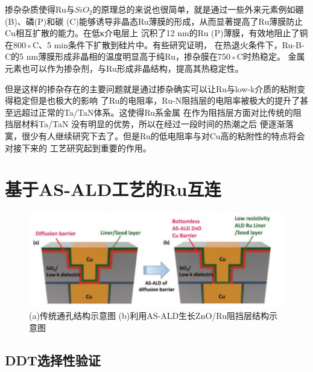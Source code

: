 \documentclass[UTF8,a4paper,12pt]{ctexart}%
\begin{document}
掺杂杂质使得Ru与$SiO_2$的原理总的来说也很简单，就是通过一些外来元素例如硼(B)、磷(P)和碳
(C)能够诱导非晶态Ru薄膜的形成，从而显著提高了Ru薄膜防止Cu相互扩散的能力。在低κ介电层上
沉积了12 nm的Ru (P)薄膜，有效地阻止了铜在800◦C、5 min条件下扩散到硅片中。有些研究证明，
在热退火条件下，Ru-B-C的5 nm薄膜形成非晶相的温度明显高于纯Ru，掺杂膜在750◦C时热稳定。
金属元素也可以作为掺杂剂，与Ru形成非晶结构，提高其热稳定性。


但是这样的掺杂存在的主要问题就是通过掺杂确实可以让Ru与low-k介质的粘附变得稳定但是也极大的影响
了Ru的电阻率，Ru-N阻挡层的电阻率被极大的提升了甚至远超过正常的Ta/TaN体系。这使得Ru系金属
在作为阻挡层方面对比传统的阻挡层材料Ta/TaN 没有明显的优势，所以在经过一段时间的热潮之后
便逐渐落寞，很少有人继续研究下去了。但是Ru的低电阻率与对Cu高的粘附性的特点将会对接下来的
工艺研究起到重要的作用。


\section{基于AS-ALD工艺的Ru互连}


\begin{figure}[htb]
	\centering
	\includegraphics[width=1\textwidth]{7.jpg}
	\caption{(a)传统通孔结构示意图 (b)利用AS-ALD生长ZnO/Ru阻挡层结构示意图}
	\label{Fig:7}
\end{figure}


\subsection{DDT选择性验证}
\end{document}
